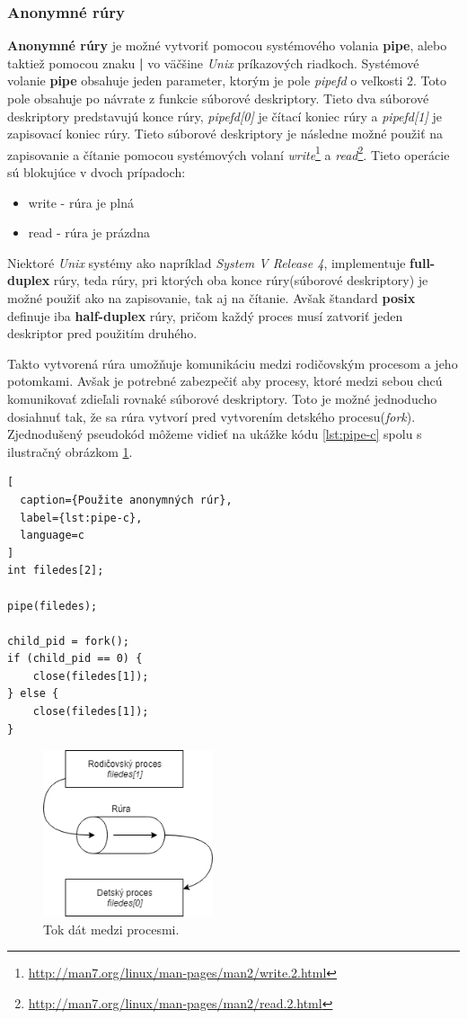 \subsubsection{Anonymné rúry}
\textbf{Anonymné rúry} je možné vytvoriť pomocou systémového volania \textbf{pipe}, alebo taktiež pomocou znaku \textbf{|} vo väčšine \textit{Unix} príkazových riadkoch. Systémové volanie \textbf{pipe} obsahuje jeden parameter, ktorým je pole \textit{pipefd} o veľkosti 2. Toto pole obsahuje po návrate z funkcie súborové deskriptory. Tieto dva súborové deskriptory predstavujú konce rúry, \textit{pipefd[0]} je čítací koniec rúry a \textit{pipefd[1]} je zapisovací koniec rúry. Tieto súborové deskriptory je následne možné použiť na zapisovanie a čítanie pomocou systémových volaní \textit{write}\footnote{\url{http://man7.org/linux/man-pages/man2/write.2.html}} a \textit{read}\footnote{\url{http://man7.org/linux/man-pages/man2/read.2.html}}. Tieto operácie sú blokujúce v dvoch prípadoch:
\begin{itemize}
\item write - rúra je plná
\item read - rúra je prázdna
\end{itemize}
Niektoré \textit{Unix} systémy ako napríklad \textit{System V Release 4}, implementuje \textbf{full-duplex} rúry, teda rúry, pri ktorých oba konce rúry(súborové deskriptory) je možné použiť ako na zapisovanie, tak aj na čítanie. Avšak štandard \textbf{\acrshort{posix}} definuje iba \textbf{half-duplex} rúry, pričom každý proces musí zatvoriť jeden deskriptor pred použitím druhého.\cite{linux}

Takto vytvorená rúra umožňuje komunikáciu medzi rodičovským procesom a jeho potomkami. Avšak je potrebné zabezpečiť aby procesy, ktoré medzi sebou chcú komunikovať zdieľali rovnaké súborové deskriptory. Toto je možné jednoducho dosiahnuť tak, že sa rúra vytvorí pred vytvorením detského procesu(\textit{fork}). Zjednodušený pseudokód môžeme vidieť na ukážke kódu \ref{lst:pipe-c} spolu s ilustračný obrázkom \ref{pipeflow}.\cite{overview}
\begin{lstlisting}[
  caption={Použite anonymných rúr},
  label={lst:pipe-c},
  language=c
]
int filedes[2];

pipe(filedes);

child_pid = fork();
if (child_pid == 0) {
	close(filedes[1]);
} else {
	close(filedes[1]);
}
\end{lstlisting}
\begin{figure}[!htbp]
  \centering
  \includegraphics[width=5cm]{img/rura.png}
  \caption{Tok dát medzi procesmi.}
  \label{pipeflow}
\end{figure}

